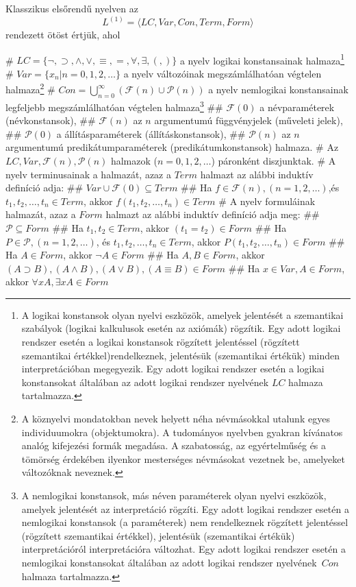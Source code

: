 \begin{definition}
	Klasszikus elsőrendű nyelven az $$ L^{(1)} = \langle LC,Var,Con,Term,Form\rangle $$ rendezett ötöst értjük, ahol
	\begin{easylist}
	# $LC = \{\neg,\supset,\land,\lor,\equiv,=,\forall,\exists,(,)\}$ a nyelv logikai konstansainak halmaza\footnote{A logikai konstansok olyan nyelvi eszközök, amelyek jelentését a szemantikai szabályok (logikai kalkulusok esetén az axiómák) rögzítik. Egy adott logikai rendszer esetén a logikai konstansok rögzített jelentéssel (rögzített szemantikai értékkel)rendelkeznek, jelentésük (szemantikai értékük) minden interpretációban megegyezik. Egy adott logikai rendszer esetén a logikai konstansokat általában az adott logikai rendszer nyelvének $LC$	halmaza tartalmazza.}
	# $Var = \{x_{n}| n = 0,1,2,\dots\}$ a nyelv változóinak megszámlálhatóan végtelen halmaza\footnote{A köznyelvi mondatokban nevek helyett néha névmásokkal utalunk egyes individuumokra (objektumokra). A tudományos nyelvben gyakran kívánatos analóg kifejezési formák megadása. A szabatosság, az egyértelműség és a tömörség érdekében ilyenkor mesterséges névmásokat vezetnek be, amelyeket változóknak neveznek.}
	# $Con = \bigcup_{n=0}^\infty(\mathcal{F}(n)\cup\mathcal{P}(n))$ a nyelv nemlogikai konstansainak legfeljebb megszámlálhatóan végtelen halmaza\footnote{A nemlogikai konstansok, más néven paraméterek olyan nyelvi eszközök, amelyek jelentését az interpretáció rögzíti. Egy adott logikai rendszer esetén a nemlogikai konstansok (a paraméterek) nem rendelkeznek rögzített jelentéssel (rögzített szemantikai értékkel), jelentésük (szemantikai értékük) interpretációról interpretációra változhat. Egy adott logikai rendszer esetén a nemlogikai konstansokat általában az adott logikai rendszer nyelvének $Con$ halmaza tartalmazza.}
	## $\mathcal{F}(0)$ a névparaméterek (névkonstansok),
	## $\mathcal{F}(n)$ az $ n $ argumentumú függvényjelek (műveleti jelek),
	## $\mathcal{P}(0)$ a állításparaméterek (állításkonstansok),
	## $\mathcal{P}(n)$ az $ n $ argumentumú predikátumparaméterek (predikátumkonstansok) halmaza.
	# Az $LC,Var,\mathcal{F}(n),\mathcal{P}(n)$ halmazok ($n = 0,1,2,\dots$) páronként diszjunktak.
	# A nyelv terminusainak a halmazát, azaz a $Term$ halmazt az alábbi induktív definíció adja:
	## $Var \cup \mathcal{F}(0)\subseteq Term$
	## Ha $f\in\mathcal{F}(n), (n=1,2,\dots)$,és $t_1,t_2,\dots,t_n \in Term$, akkor $f(t_1,t_2,\dots,t_n)\in Term$
	# \label{itm:induction}A nyelv formuláinak halmazát, azaz a $Form$ halmazt az alábbi induktív definíció adja meg:
	## \label{itm:rule1} $\mathcal{P}\subseteq Form$
	## \label{itm:rule2} Ha $t_1,t_2 \in Term$, akkor $(t_1 = t_2) \in Form$
	## \label{itm:rule3} Ha $P \in \mathcal{P}, (n=1,2,\dots)$, és $t_1,t_2,\dots,t_n\in Term$, akkor $P(t_1,t_2,\dots,t_n)\in Form$
	## Ha $A \in Form$, akkor $\neg A \in Form$
	## Ha $A,B \in Form$, akkor $(A \supset B),(A \land B),(A\lor B),(A\equiv B) \in Form$
	## Ha $x\in Var, A\in Form$, akkor $\forall x A, \exists x A \in Form$
	\end{easylist}
\end{definition}
